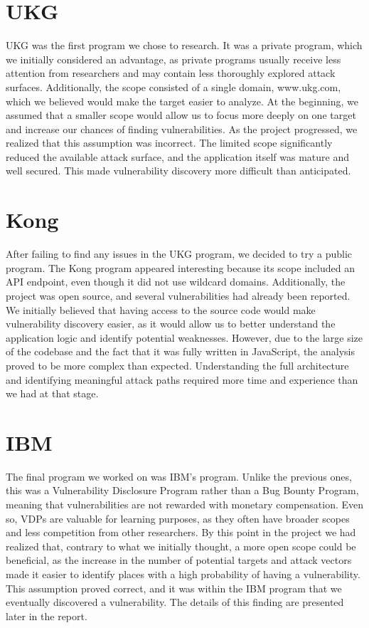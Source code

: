 \documentclass[12pt,a4paper]{report}
\begin{document}
\section{UKG}

UKG was the first program we chose to research. It was a private program, which we initially considered an advantage, as private programs usually receive less attention from researchers and may contain less thoroughly explored attack surfaces. Additionally, the scope consisted of a single domain, www.ukg.com, which we believed would make the target easier to analyze.
At the beginning, we assumed that a smaller scope would allow us to focus more deeply on one target and increase our chances of finding vulnerabilities. As the project progressed, we realized that this assumption was incorrect. The limited scope significantly reduced the available attack surface, and the application itself was mature and well secured. This made vulnerability discovery more difficult than anticipated.


\section{Kong}

After failing to find any issues in the UKG program, we decided to try a public program. The Kong program appeared interesting because its scope included an API endpoint, even though it did not use wildcard domains. Additionally, the project was open source, and several vulnerabilities had already been reported.
We initially believed that having access to the source code would make vulnerability discovery easier, as it would allow us to better understand the application logic and identify potential weaknesses. However, due to the large size of the codebase and the fact that it was fully written in JavaScript, the analysis proved to be more complex than expected. Understanding the full architecture and identifying meaningful attack paths required more time and experience than we had at that stage.


\section{IBM}

The final program we worked on was IBM’s program. Unlike the previous ones, this was a Vulnerability Disclosure Program rather than a Bug Bounty Program, meaning that vulnerabilities are not rewarded with monetary compensation. Even so, VDPs are valuable for learning purposes, as they often have broader scopes and less competition from other researchers.
By this point in the project we had realized that, contrary to what we initially thought, a more open scope could be beneficial, as the increase in the number of potential targets and attack vectors made it easier to identify places with a high probability of having a vulnerability. This assumption proved correct, and it was within the IBM program that we eventually discovered a vulnerability. The details of this finding are presented later in the report.
\end{document}
